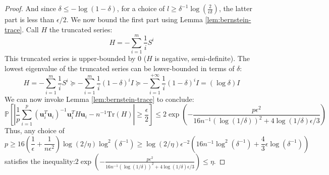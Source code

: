 \begin{proof}
And since $\delta\le-\log\left(1-\delta\right)$, for a choice of
$l\geq\delta^{-1}\log\left(\frac{2}{\epsilon\delta}\right)$, the
latter part is less than $\epsilon/2$. We now bound the first part
using Lemma \ref{lem:bernstein-trace}. Call $H$ the truncated series:
\[
H=-\sum_{i=1}^{m}\frac{1}{i}S^{i}
\]
This truncated series is upper-bounded by $0$ ($H$ is negative,
semi-definite). The lowest eigenvalue of the truncated series can
be lower-bounded in terms of $\delta$: 
\[
H=-\sum_{i=1}^{m}\frac{1}{i}S^{i}\succeq-\sum_{i=1}^{m}\frac{1}{i}\left(1-\delta\right)^{i}I\succeq-\sum_{i=1}^{+\infty}\frac{1}{i}\left(1-\delta\right)^{i}I=\left(\log\delta\right)I
\]
We can now invoke Lemma \ref{lem:bernstein-trace} to conclude: 
\[
\mathbb{P}\left[\left|\frac{1}{p}\sum_{i=1}^{p}\left(\mathbf{u}_{i}^{T}\mathbf{u}_{i}\right)^{-1}\mathbf{u}_{i}^{T}H\mathbf{u}_{i}-n^{-1}\mbox{Tr}\left(H\right)\right|\geq\frac{\epsilon}{2}\right]\leq2\exp\left(-\frac{p\epsilon^{2}}{16n^{-1}\left(\log\left(1/\delta\right)\right)^{2}+4\log\left(1/\delta\right)\epsilon/3}\right)
\]
Thus, any choice of 
\[
p\geq16\left(\frac{1}{\epsilon}+\frac{1}{n\epsilon^{2}}\right)\log\left(2/\eta\right)\log^{2}\left(\delta^{-1}\right)\geq\log\left(2/\eta\right)\epsilon^{-2}\left(16n^{-1}\log^{2}\left(\delta^{-1}\right)+\frac{4}{3}\epsilon\log\left(\delta^{-1}\right)\right)
\]
satisfies the inequality:$2\exp\left(-\frac{p\epsilon^{2}}{16n^{-1}\left(\log\left(1/\delta\right)\right)^{2}+4\log\left(1/\delta\right)\epsilon/3}\right)\leq\eta$. 
\end{proof}


